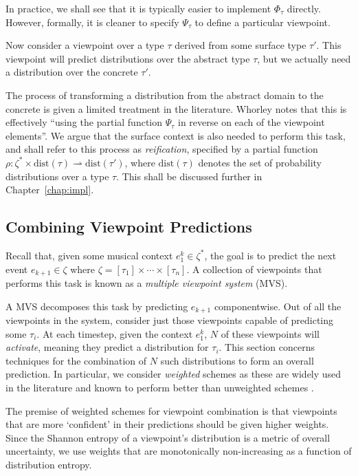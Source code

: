 \documentclass[12pt,a4paper,twoside,openright]{report}
\begin{document}
In practice, we shall see that it is typically easier to implement $\Phi_\tau$
directly. However, formally, it is cleaner to specify $\Psi_\tau$ to define a
particular viewpoint.

Now consider a viewpoint over a type $\tau$ derived from some surface type
$\tau'$. This viewpoint will predict distributions over the abstract type
$\tau$, but we actually need a distribution over the concrete $\tau'$. 

The process of transforming a distribution from the abstract domain to the
concrete is given a limited treatment in the literature. Whorley
\cite{whorley2013phd} notes that this is effectively ``using the partial
function $\Psi_\tau$ in reverse on each of the viewpoint elements''. We argue
that the surface context is also needed to perform this task, and shall refer to
this process as \emph{reification}, specified by a partial function $\rho :
\zeta^* \times \mathrm{dist}(\tau) \rightharpoonup \mathrm{dist}(\tau')$, where
$\mathrm{dist}(\tau)$ denotes the set of probability distributions over a type
$\tau$. This shall be discussed further in Chapter~\ref{chap:impl}.

\subsection{Combining Viewpoint Predictions}\label{sec:vp-comb}

Recall that, given some musical context $e_1^k \in \zeta^*$, the goal is to
predict the next event $e_{k+1} \in \zeta$ where $\zeta = [\tau_1] \times \cdots
\times [\tau_n]$.  A collection of viewpoints that performs this task is known
as a \emph{multiple viewpoint system} (MVS). 

A MVS decomposes this task by predicting $e_{k+1}$ componentwise. Out of all the
viewpoints in the system, consider just those viewpoints capable of predicting
some $\tau_i$. At each timestep, given the context $e_1^k$, $N$ of these
viewpoints will \emph{activate}, meaning they predict a distribution for
$\tau_i$. This section concerns techniques for the combination of $N$ such
distributions to form an overall prediction. In particular, we consider
\emph{weighted} schemes as these are widely used in the literature and known to
perform better than unweighted schemes \cite{pearce2004combining}.

The premise of weighted schemes for viewpoint combination is that viewpoints
that are more `confident' in their predictions should be given higher weights.
Since the Shannon entropy of a viewpoint's distribution is a metric of overall
uncertainty, we use weights that are monotonically non-increasing as a function
of distribution entropy.
\end{document}
